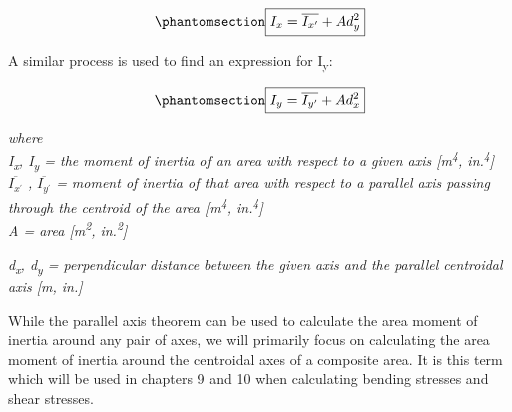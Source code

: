 \documentclass[
  letterpaper,
  DIV=11,
  numbers=noendperiod]{scrreprt}
\theoremstyle{definition}
\theoremstyle{remark}
\begin{document}
\begin{equation}\phantomsection\label{eq-8.3}{
\boxed{I_x=\overline{I_{x^{\prime}}}+A d_y^2}
}\end{equation}

A similar process is used to find an expression for I\textsubscript{y}:

\begin{equation}\phantomsection\label{eq-8.4}{
\boxed{I_y=\overline{I_{y^{\prime}}}+A d_x^2}
}\end{equation}

\emph{where}\\
\emph{I\textsubscript{x}, I\textsubscript{y} = the moment of inertia of
an area with respect to a given axis {[}m\textsuperscript{4},
in.\textsuperscript{4}{]}}\\
\(\overline{I_{x^{\prime}}}\) \emph{,} \(\overline{I_{y^{\prime}}}\)
\emph{= moment of inertia of that area with respect to a parallel axis
passing through the centroid of the area {[}m\textsuperscript{4},
in.\textsuperscript{4}{]}}\\
\emph{A = area {[}m\textsuperscript{2}, in.\textsuperscript{2}{]}}

\emph{d\textsubscript{x}, d\textsubscript{y} = perpendicular distance
between the given axis and the parallel centroidal axis {[}m, in.{]}}

While the parallel axis theorem can be used to calculate the area moment
of inertia around any pair of axes, we will primarily focus on
calculating the area moment of inertia around the centroidal axes of a
composite area. It is this term which will be used in chapters 9 and 10
when calculating bending stresses and shear stresses.
\end{document}
